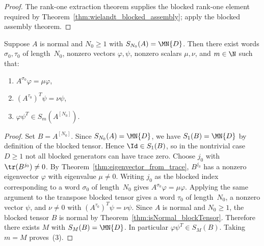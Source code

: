\begin{proof}\leanok
    The rank-one extraction theorem supplies the blocked rank-one element
    required by Theorem~\ref{thm:wielandt_blocked_assembly}; apply the blocked
    assembly theorem.
\end{proof}

\begin{theorem}%
    \label{thm:rankone_extraction_blockTensor}
    \leanok
    Suppose $A$ is normal and $N_0 \ge 1$ with
    $S_{N_0}(A) = \MN{D}$.
    Then there exist words $\sigma_0, \tau_0$ of length~$N_0$,
    nonzero vectors $\varphi, \psi$, nonzero scalars $\mu, \nu$,
    and $m \in \N$ such that:
    \begin{enumerate}
        \item $A^{\sigma_0} \varphi = \mu \varphi$,
        \item $(A^{\tau_0})^T \psi = \nu \psi$,
        \item $\varphi \psi^T \in S_m(A^{[N_0]})$.
    \end{enumerate}
\end{theorem}

\begin{proof}
    \leanok
    Set $B = A^{[N_0]}$.
    Since $S_{N_0}(A) = \MN{D}$, we have $S_1(B) = \MN{D}$
    by definition of the blocked tensor.
    Hence $\Id \in S_1(B)$, so in the nontrivial case $D \ge 1$
    not all blocked generators can have trace zero.
    Choose $j_0$ with $\tr(B^{j_0}) \neq 0$.
    By Theorem~\ref{thm:eigenvector_from_trace},
    $B^{j_0}$ has a nonzero eigenvector $\varphi$
    with eigenvalue $\mu \neq 0$.
    Writing $j_0$ as the blocked index corresponding to a word
    $\sigma_0$ of length~$N_0$ gives
    $A^{\sigma_0} \varphi = \mu \varphi$.
    Applying the same argument to the transpose blocked tensor gives
    a word $\tau_0$ of length~$N_0$, a nonzero vector $\psi$,
    and $\nu \neq 0$ with $(A^{\tau_0})^T \psi = \nu \psi$.
    Since $A$ is normal and $N_0 \ge 1$,
    the blocked tensor $B$ is normal by
    Theorem~\ref{thm:isNormal_blockTensor}.
    Therefore there exists $M$ with $S_M(B) = \MN{D}$.
    In particular $\varphi \psi^T \in S_M(B)$.
    Taking $m = M$ proves~(3).
\end{proof}

